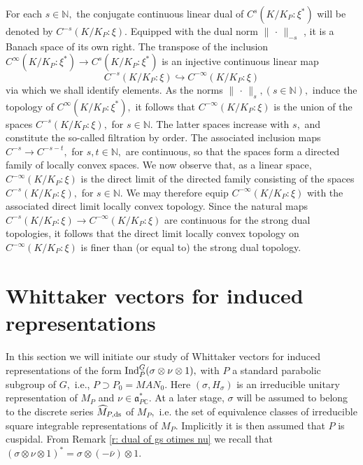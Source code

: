 \documentclass[12pt,a4paper]{article}
\def\msy#1{{\mathbb #1}}
\def\C{{\msy C}}
\def\N{{\msy N}}
\def\gs{\sigma}
\def\got#1{\mathfrak #1}
\def\fa{{\got a}}
\def\to{\rightarrow}
\def\iC{{\scriptscriptstyle \C}}
\numberwithin{Thm}{section}
\numberwithin{equation}{section}
\def\Ind{{\rm Ind}}
\def\dotvar{\, \cdot\,}
\def\embeds{\hookrightarrow}
\def\faPdc{{\fa_{P\iC}^*}}
\numberwithin{equation}{section}
\def\faPdc{\fa_{P\iC}^*}
\def\MPds{\widehat M_{P,\rm ds}}
\begin{document}
For each $s \in \N,$ the conjugate continuous linear dual of $C^s(K/K_P:\xi^*)$ will
be denoted by $C^{-s}(K/K_P:\xi).$ Equipped with the dual norm $\|\dotvar\|_{-s}$ , it is 
a Banach space of its own right. The transpose of the inclusion $C^{\infty}(K/K_P : \xi^*)
\to C^{s}(K/K_P:\xi^*)$  is an injective continuous linear map 
\begin{equation}
\label{e: limit topology}
C^{-s}(K/K_P:\xi) \embeds C^{-\infty}(K/K_P:\xi)
\end{equation}%
via which we shall identify elements. As the norms $\|\dotvar\|_s, (s \in \N),$ 
induce the topology of $C^\infty(K/K_P:\xi^*),$ it follows that $C^{-\infty}(K/K_P:\xi)$ 
is the union of the spaces $C^{-s}(K/K_P:\xi),$ for $s \in \N.$
%
The latter spaces increase with 
$s,$ and constitute the so-called filtration by order.
The associated inclusion maps
$C^{-s} \to C^{-s-t},$ for $s ,t \in \N,$ are continuous, so that the spaces form a directed
family of locally convex spaces.
%
%
We now observe that, as a linear space,
$C^{-\infty}(K/K_P:\xi)$ is the direct limit of the directed family consisting of the spaces 
$C^{-s}(K/K_P:\xi),$ for $s \in \N.$ We may therefore equip $C^{-\infty}(K/K_P:\xi)$ 
with the associated direct limit locally convex topology.  Since the  natural maps
$C^{-s}(K/K_P:\xi) \to C^{-\infty}(K/K_P: \xi)$ are continuous for the strong
dual topologies, it follows that the direct limit locally convex topology on 
$C^{-\infty}(K/K_P: \xi)$ is finer than (or equal to) the strong dual topology. 
%

\section{Whittaker vectors for induced representations}
\label{s: whit for ind reps}
In this section we will initiate our study of Whittaker vectors
for induced representations of the form $\Ind_{\bar P}^G (\gs \otimes \nu \otimes 1),$ 
with $P$ a standard parabolic subgroup of $G,$ i.e., $P \supset P_0 = M A N_0.$ 
Here $(\gs, H_\gs)$ is an irreducible unitary representation of $M_P$ 
and $\nu \in \faPdc.$ 
%
At a later stage, 
$\gs$ will be assumed to belong to the 
discrete series $\MPds$ of $M_P,$ i.e. the set of equivalence classes of irreducible square
integrable representations of $M_P.$ Implicitly it is then assumed that $P$ is cuspidal.
%
From Remark \ref{r: dual of gs otimes nu} we recall that $(\gs \otimes \nu \otimes 1)^* = 
\gs \otimes (-\bar \nu) \otimes 1.$ 
\end{document}
